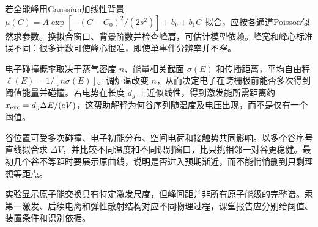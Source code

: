 若全能峰用Gaussian加线性背景 $\mu(C)=A\exp[-(C-C_0)^2/(2s^2)]+b_0+b_1C$ 拟合，应按各通道Poisson似然求参数。换拟合窗口、背景阶数并检查峰肩，可估计模型依赖。峰宽和峰心标准误不同：很多计数可使峰心很准，即使单事件分辨率并不窄。

电子碰撞概率取决于蒸气密度 $n$、能量相关截面 $\sigma(E)$ 和传播距离，平均自由程 $\ell(E)=1/[n\sigma(E)]$。调炉温改变 $n$，从而决定电子在跨栅极前能否多次得到阈值能量并碰撞。若电势在长度 $d_g$ 上近似线性，得到激发能所需距离约 $x_{\rm exc}=d_g\Delta E/(eV)$，这帮助解释为何谷序列随温度及电压出现，而不是仅有一个阈值。

谷位置可受多次碰撞、电子初能分布、空间电荷和接触势共同影响。以多个谷序号直线拟合求 $\Delta V$，并比较不同温度和不同识别窗口，比只挑相邻一对谷更稳健。最初几个谷不等距时要展示原曲线，说明是否进入预期渐近，而不能悄悄删到只剩理想等距点。

实验显示原子能交换具有特定激发尺度，但峰间距并非所有原子能级的完整谱。汞第一激发、后续电离和弹性散射结构对应不同物理过程，课堂报告应分别给阈值、装置条件和识别依据。
